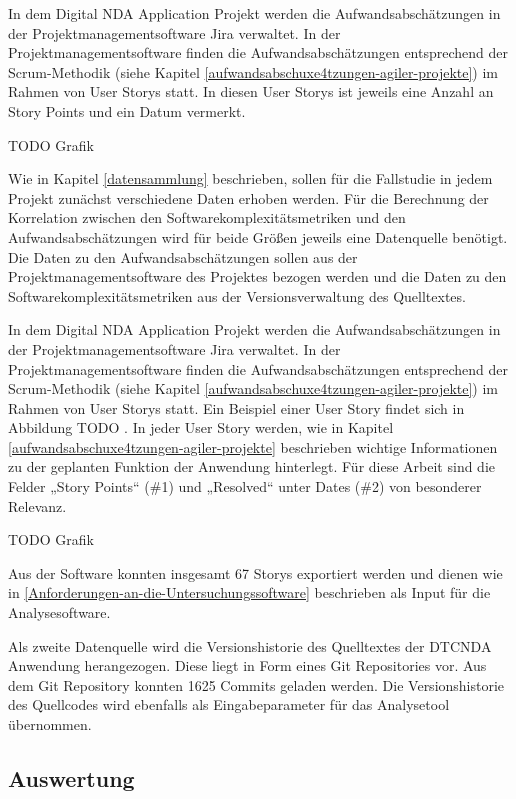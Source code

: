 In dem Digital \ac{NDA} Application Projekt werden die Aufwandsabschätzungen
in der Projektmanagementsoftware Jira verwaltet. In der
Projektmanagementsoftware finden die Aufwandsabschätzungen entsprechend
der Scrum-Methodik (siehe Kapitel \ref{aufwandsabschuxe4tzungen-agiler-projekte}) im Rahmen von User Storys statt.
In diesen User Storys ist jeweils eine Anzahl an Story Points und ein Datum vermerkt.

TODO Grafik

Wie in Kapitel \ref{datensammlung} beschrieben, sollen für die Fallstudie in jedem
Projekt zunächst verschiedene Daten erhoben werden. Für die Berechnung
der Korrelation zwischen den Softwarekomplexitätsmetriken und den
Aufwandsabschätzungen wird für beide Größen jeweils eine Datenquelle
benötigt. Die Daten zu den Aufwandsabschätzungen sollen aus der
Projektmanagementsoftware des Projektes bezogen werden und die Daten zu
den Softwarekomplexitätsmetriken aus der Versionsverwaltung des
Quelltextes.

In dem Digital \ac{NDA} Application Projekt werden die Aufwandsabschätzungen
in der Projektmanagementsoftware Jira verwaltet. In der
Projektmanagementsoftware finden die Aufwandsabschätzungen entsprechend
der Scrum-Methodik (siehe Kapitel \ref{aufwandsabschuxe4tzungen-agiler-projekte}) im Rahmen von User Storys statt.
Ein Beispiel einer User Story findet sich in Abbildung TODO . In
jeder User Story werden, wie in Kapitel \ref{aufwandsabschuxe4tzungen-agiler-projekte} beschrieben wichtige
Informationen zu der geplanten Funktion der Anwendung hinterlegt. Für
diese Arbeit sind die Felder „Story Points`` (\#1) und „Resolved`` unter
Dates (\#2) von besonderer Relevanz.

TODO Grafik

Aus der Software konnten insgesamt 67 Storys exportiert werden und
dienen wie in \ref{Anforderungen-an-die-Untersuchungssoftware} beschrieben als Input für die Analysesoftware.

Als zweite Datenquelle wird die Versionshistorie des Quelltextes der
DTCNDA Anwendung herangezogen. Diese liegt in Form eines Git
Repositories vor. Aus dem Git Repository konnten 1625 Commits geladen
werden. Die Versionshistorie des Quellcodes wird ebenfalls als
Eingabeparameter für das Analysetool übernommen.

\subsection{Auswertung}\label{nda-Auswertung}

